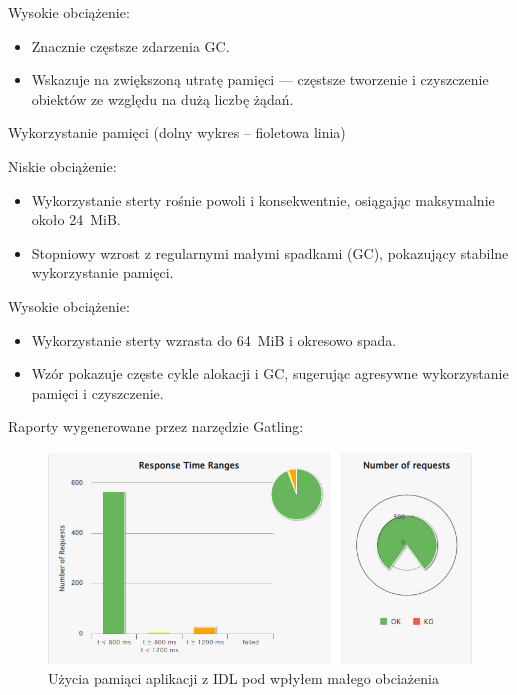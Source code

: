 \documentclass[runningheads,12pt]{llncs}
\begin{document}
Wysokie obciążenie:

\begin{itemize}
  \item Znacznie częstsze zdarzenia GC.
  \item Wskazuje na zwiększoną utratę pamięci — częstsze tworzenie i czyszczenie obiektów ze względu na dużą liczbę żądań.
\end{itemize}

\vspace{0.5cm}

Wykorzystanie pamięci (dolny wykres – fioletowa linia)

Niskie obciążenie:

\begin{itemize}
  \item Wykorzystanie sterty rośnie powoli i konsekwentnie, osiągając maksymalnie około 24~MiB.
  \item Stopniowy wzrost z regularnymi małymi spadkami (GC), pokazujący stabilne wykorzystanie pamięci.
\end{itemize}

Wysokie obciążenie:

\begin{itemize}
  \item Wykorzystanie sterty wzrasta do 64~MiB i okresowo spada.
  \item Wzór pokazuje częste cykle alokacji i GC, sugerując agresywne wykorzystanie pamięci i czyszczenie.
\end{itemize}

\newpage


Raporty wygenerowane przez narzędzie Gatling: 

\begin{figure}
    \includegraphics[width=\linewidth]{images/idl-low-gatling-graph.jpg}
    \caption{Użycia pamiąci aplikacji z IDL pod wpłyłem małego obciażenia} \label{fig1}
\end{figure}
\end{document}

